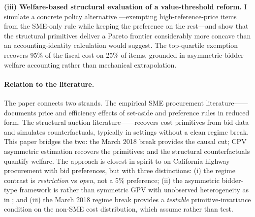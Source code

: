 \documentclass[12pt]{article}
\begin{document}
\noindent\textbf{(iii) Welfare-based structural evaluation of a
value-threshold reform.} I simulate a concrete policy alternative
---exempting high-reference-price items from the SME-only rule
while keeping the preference on the rest---and show that the
structural primitives deliver a Pareto frontier considerably more
concave than an accounting-identity calculation would suggest.
The top-quartile exemption recovers 95\% of the fiscal cost on
25\% of items, grounded in asymmetric-bidder welfare accounting
rather than mechanical extrapolation.

\paragraph{Relation to the literature.}
The paper connects two strands. The empirical SME procurement
literature---\citet{marion2007, denes1997, ferraz2015, szucs2024}---documents
price and efficiency effects of set-aside and preference rules in
reduced form. The structural auction literature---\citet{gpv2000,
campo2003, krasnokutskaya2011, athey2013, bajari2014,
bajarihortacsu2005, hendricks2003}---recovers cost primitives from
bid data and simulates counterfactuals, typically in settings without
a clean regime break. This paper bridges the two:
the March 2018 break provides the causal cut; CPV asymmetric estimation
recovers the primitives; and the structural counterfactuals quantify
welfare. The approach is closest in spirit to
\citet{krasnokutskayaseim2011} on California highway procurement with
bid preferences, but with three distinctions: (i) the regime contrast
is \emph{restriction} vs \emph{open}, not a 5\% preference; (ii) the
asymmetric bidder-type framework is \citet{campo2003} rather than
symmetric GPV with unobserved heterogeneity as in
\citet{krasnokutskaya2011}; and (iii) the March 2018 regime break
provides a \emph{testable} primitive-invariance condition on the
non-SME cost distribution, which \citet{krasnokutskayaseim2011} assume
rather than test.
\end{document}
